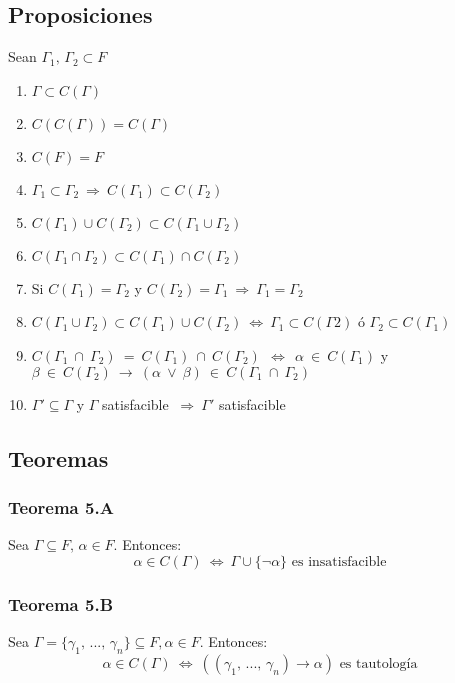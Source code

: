 \documentclass{article}
\newcommand{\comma}{,\,}                                %
\newcommand{\Rightarrows}{\: \Rightarrow \:}            %
\newcommand{\Leftrightarrows}{\: \Leftrightarrow \:}    %
\begin{document}
\subsection{Proposiciones}
Sean $\Gamma_1 \comma \Gamma_2 \subset F$
\begin{enumerate}
    \item $\Gamma \subset C(\Gamma)$
    \item $C(C(\Gamma)) = C(\Gamma)$
    \item $C(F) = F$
    \item $\Gamma_1 \subset \Gamma_2 \Rightarrows C(\Gamma_1) \subset C(\Gamma_2)$
    \item $C(\Gamma_1) \cup C(\Gamma_2) \subset C(\Gamma_1 \cup \Gamma_2)$
    \item $C(\Gamma_1 \cap \Gamma_2) \subset C(\Gamma_1) \cap C(\Gamma_2)$
    \item Si $C(\Gamma_1) = \Gamma_2$ y $C(\Gamma_2) = \Gamma_1 \Rightarrows \Gamma_1 = \Gamma_2$
    \item $C(\Gamma_1 \cup \Gamma_2) \subset C(\Gamma_1) \cup C(\Gamma_2) \Leftrightarrows \Gamma_1 \subset C(\Gamma2)$ ó $\Gamma_2 \subset C(\Gamma_1)$ 
    \item $C(\Gamma_1~\cap~\Gamma_2)~=~C(\Gamma_1)~\cap~C(\Gamma_2)~\Leftrightarrows~ \alpha~\in~C(\Gamma_1)$ y $\beta~\in~C(\Gamma_2)~\rightarrow~ (\alpha~\vee~\beta)~\in~C(\Gamma_1~\cap~\Gamma_2)$
    \item $\Gamma' \subseteq \Gamma$ y $\Gamma$ satisfacible $\Rightarrows \Gamma'$ satisfacible
\end{enumerate}


\subsection{Teoremas}
\subsubsection{Teorema 5.A}
Sea $\Gamma \subseteq F \comma \alpha \in F$. Entonces:
\begin{equation*}
    \alpha \in C(\Gamma) \Leftrightarrows \Gamma \cup \{\neg \alpha\} \text{ es insatisfacible}
\end{equation*}

\subsubsection{Teorema 5.B}
Sea $\Gamma = \{ \gamma_1 \comma ... \comma \gamma_n \} \subseteq F, \alpha \in F$. Entonces:
\begin{equation*}
    \alpha \in C(\Gamma) \Leftrightarrows ((\gamma_1 \comma ... \comma \gamma_n) \rightarrow \alpha) \text{ es tautología}
\end{equation*}
\end{document}
